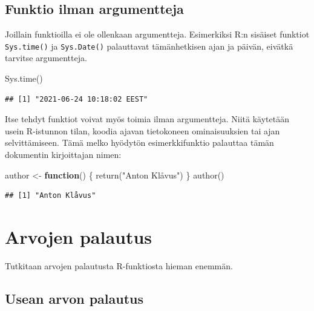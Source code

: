 \documentclass[
]{book}
\newenvironment{Shaded}{\begin{snugshade}}{\end{snugshade}}
\newcommand{\ControlFlowTok}[1]{\textcolor[rgb]{0.13,0.29,0.53}{\textbf{#1}}}
\newcommand{\FunctionTok}[1]{\textcolor[rgb]{0.00,0.00,0.00}{#1}}
\newcommand{\NormalTok}[1]{#1}
\newcommand{\OtherTok}[1]{\textcolor[rgb]{0.56,0.35,0.01}{#1}}
\newcommand{\StringTok}[1]{\textcolor[rgb]{0.31,0.60,0.02}{#1}}
\begin{document}
\hypertarget{funktio-ilman-argumentteja}{%
\subsection{Funktio ilman argumentteja}\label{funktio-ilman-argumentteja}}

Joillain funktioilla ei ole ollenkaan argumentteja. Esimerkiksi R:n sisäiset funktiot \texttt{Sys.time()} ja \texttt{Sys.Date()} palauttavat tämänhetkisen ajan ja päivän, eivätkä tarvitse argumentteja.

\begin{Shaded}
\begin{Highlighting}[]
\FunctionTok{Sys.time}\NormalTok{()}
\end{Highlighting}
\end{Shaded}

\begin{verbatim}
## [1] "2021-06-24 10:18:02 EEST"
\end{verbatim}

Itse tehdyt funktiot voivat myös toimia ilman argumentteja. Niitä käytetään usein R-istunnon tilan, koodia ajavan tietokoneen ominaisuuksien tai ajan selvittämiseen. Tämä melko hyödytön esimerkkifunktio palauttaa tämän dokumentin kirjoittajan nimen:

\begin{Shaded}
\begin{Highlighting}[]
\NormalTok{author }\OtherTok{\textless{}{-}} \ControlFlowTok{function}\NormalTok{() \{}
  \FunctionTok{return}\NormalTok{(}\StringTok{"Anton Klåvus"}\NormalTok{)}
\NormalTok{\}}
\FunctionTok{author}\NormalTok{()}
\end{Highlighting}
\end{Shaded}

\begin{verbatim}
## [1] "Anton Klåvus"
\end{verbatim}

\hypertarget{arvojen-palautus}{%
\section{Arvojen palautus}\label{arvojen-palautus}}

Tutkitaan arvojen palautusta R-funktiosta hieman enemmän.

\hypertarget{usean-arvon-palautus}{%
\subsection{Usean arvon palautus}\label{usean-arvon-palautus}}
\end{document}

